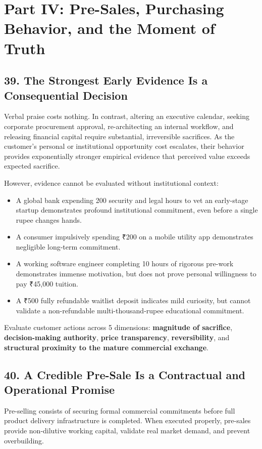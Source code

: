 \section*{Part IV: Pre-Sales, Purchasing Behavior, and the Moment of Truth}

\subsection*{39. The Strongest Early Evidence Is a Consequential Decision}

Verbal praise costs nothing. In contrast, altering an executive calendar, seeking corporate procurement approval, re-architecting an internal workflow, and releasing financial capital require substantial, irreversible sacrifices. As the customer's personal or institutional opportunity cost escalates, their behavior provides exponentially stronger empirical evidence that perceived value exceeds expected sacrifice.

However, evidence cannot be evaluated without institutional context:
\begin{itemize}
    \item A global bank expending 200 security and legal hours to vet an early-stage startup demonstrates profound institutional commitment, even before a single rupee changes hands.
    \item A consumer impulsively spending ₹200 on a mobile utility app demonstrates negligible long-term commitment.
    \item A working software engineer completing 10 hours of rigorous pre-work demonstrates immense motivation, but does not prove personal willingness to pay ₹45,000 tuition.
    \item A ₹500 fully refundable waitlist deposit indicates mild curiosity, but cannot validate a non-refundable multi-thousand-rupee educational commitment.
\end{itemize}

Evaluate customer actions across 5 dimensions: \textbf{magnitude of sacrifice}, \textbf{decision-making authority}, \textbf{price transparency}, \textbf{reversibility}, and \textbf{structural proximity to the mature commercial exchange}.

\subsection*{40. A Credible Pre-Sale Is a Contractual and Operational Promise}

Pre-selling consists of securing formal commercial commitments before full product delivery infrastructure is completed. When executed properly, pre-sales provide non-dilutive working capital, validate real market demand, and prevent overbuilding.

